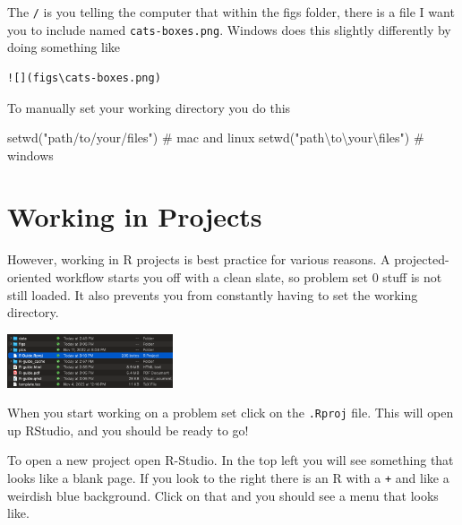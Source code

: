\documentclass[
  letterpaper,
  DIV=11,
  numbers=noendperiod,
  oneside]{scrreprt}
\newenvironment{Shaded}{\begin{snugshade}}{\end{snugshade}}
\newcommand{\CommentTok}[1]{\textcolor[rgb]{0.37,0.37,0.37}{#1}}
\newcommand{\FunctionTok}[1]{\textcolor[rgb]{0.28,0.35,0.67}{#1}}
\newcommand{\NormalTok}[1]{\textcolor[rgb]{0.00,0.23,0.31}{#1}}
\newcommand{\SpecialCharTok}[1]{\textcolor[rgb]{0.37,0.37,0.37}{#1}}
\newcommand{\StringTok}[1]{\textcolor[rgb]{0.13,0.47,0.30}{#1}}
\begin{document}
The \texttt{/} is you telling the computer that within the figs folder,
there is a file I want you to include named \texttt{cats-boxes.png}.
Windows does this slightly differently by doing something like

\begin{verbatim}
![](figs\cats-boxes.png)
\end{verbatim}

To manually set your working directory you do this

\begin{Shaded}
\begin{Highlighting}[]
\FunctionTok{setwd}\NormalTok{(}\StringTok{"path/to/your/files"}\NormalTok{) }\CommentTok{\# mac and linux}
\FunctionTok{setwd}\NormalTok{(}\StringTok{"path}\SpecialCharTok{\textbackslash{}t}\StringTok{o\textbackslash{}your}\SpecialCharTok{\textbackslash{}f}\StringTok{iles"}\NormalTok{) }\CommentTok{\# windows}
\end{Highlighting}
\end{Shaded}

\hypertarget{working-in-projects}{%
\section{Working in Projects}\label{working-in-projects}}

However, working in R projects is best practice for various reasons. A
projected-oriented workflow starts you off with a clean slate, so
problem set 0 stuff is not still loaded. It also prevents you from
constantly having to set the working directory.

\includegraphics[width=1.93in,height=\textheight]{figs/r-project-in-folder.png}

When you start working on a problem set click on the \texttt{.Rproj}
file. This will open up RStudio, and you should be ready to go!

To open a new project open R-Studio. In the top left you will see
something that looks like a blank page. If you look to the right there
is an R with a \texttt{+} and like a weirdish blue background. Click on
that and you should see a menu that looks like.
\end{document}
